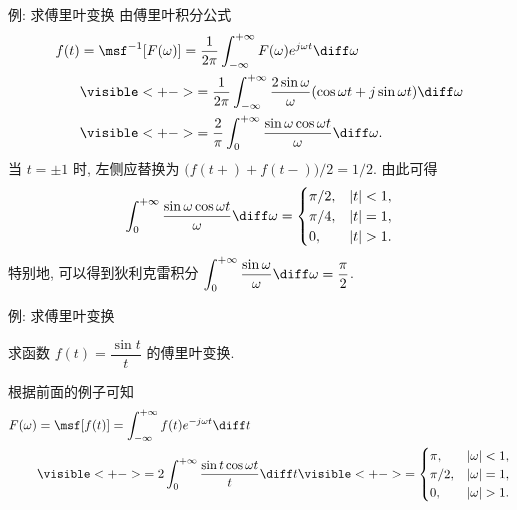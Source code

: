 \begin{frame}{例: 求傅里叶变换}
	\onslide<+->
	由傅里叶积分公式
	\begin{align*}
		f(t)&=\msf^{-1}[F(\omega)]=\frac1{2\pi}\int_{-\infty}^{+\infty}F(\omega)e^{j\omega t}\diff\omega\\
		&\visible<+->{=\frac1{2\pi}\int_{-\infty}^{+\infty}\frac{2\sin\omega}{\omega}(\cos\omega t+j\sin\omega t)\diff \omega}\\
		&\visible<+->{=\frac2\pi\int_0^{+\infty}\frac{\sin\omega\cos\omega t}{\omega}\diff \omega.}
	\end{align*}
	\onslide<+->
	当 $t=\pm1$ 时, 左侧应替换为 $\bigl(f(t+)+f(t-)\bigr)/2=1/2 $.
	\onslide<+->
	由此可得
	\[\int_0^{+\infty}\frac{\sin \omega\cos\omega t}\omega\diff\omega=\begin{cases}
		\pi/2,&|t|<1,\\
		\pi/4,&|t|=1,\\
		0,&|t|>1.
	\end{cases}\]
	\onslide<+->
	特别地, 可以得到狄利克雷积分
	$\displaystyle\int_0^{+\infty}\frac{\sin\omega}\omega\diff\omega=\frac\pi2$.
\end{frame}


\begin{frame}{例: 求傅里叶变换}
	\onslide<+->
	\begin{example}
		求函数 $f(t)=\dfrac{\sin t}{t}$ 的傅里叶变换.
	\end{example}

	\onslide<+->
	\begin{solution}
		根据前面的例子可知
		\vspace{-\baselineskip}
		\begin{align*}
			F(\omega)&=\msf[f(t)]=\int_{-\infty}^{+\infty}f(t)e^{-j\omega t}\diff t\\
			&\visible<+->{=2\int_0^{+\infty}\frac{\sin t\cos\omega t}{t}\diff t}
			\visible<+->{=\begin{cases}
				\pi,&|\omega|<1,\\
				\pi/2,&|\omega|=1,\\
				0,&|\omega|>1.
				\end{cases}}
		\end{align*}
	\end{solution}
\end{frame}


